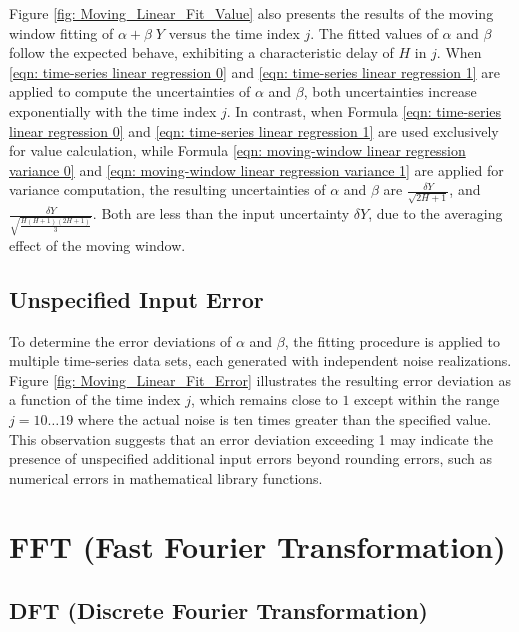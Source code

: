 \documentclass[twoside]{article}
\numberwithin{equation}{section}
\newcommand{\Verbose}{}
\begin{document}
Figure \ref{fig: Moving_Linear_Fit_Value} also presents the results of the moving window fitting of $\alpha + \beta\; Y$ versus the time index $j$.
The fitted values of $\alpha$ and $\beta$ follow the expected behave, exhibiting a characteristic delay of $H$ in $j$.
When \eqref{eqn: time-series linear regression 0} and \eqref{eqn: time-series linear regression 1} are applied to compute the uncertainties of $\alpha$ and $\beta$, both uncertainties increase exponentially with the time index $j$.
In contrast, when Formula \eqref{eqn: time-series linear regression 0} and \eqref{eqn: time-series linear regression 1} are used exclusively for value calculation, while Formula \eqref{eqn: moving-window linear regression variance 0} and \eqref{eqn: moving-window linear regression variance 1} are applied for variance computation, the resulting uncertainties of $\alpha$ and $\beta$ are $\frac{\delta Y}{\sqrt{2H+1}}$, and $\frac{\delta Y}{\sqrt{\frac{H (H+1)(2H+1)}{3}}}$.
Both are less than the input uncertainty $\delta Y$, due to the averaging effect of the moving window.


\subsection{Unspecified Input Error}

To determine the error deviations of $\alpha$ and $\beta$, the fitting procedure is applied to multiple time-series data sets, each generated with independent noise realizations.
Figure \ref{fig: Moving_Linear_Fit_Error} illustrates the resulting error deviation as a function of the time index $j$, which remains close to $1$ except within the range $j = 10 \dots 19$ where the actual noise is ten times greater than the specified value.
This observation suggests that an error deviation exceeding 1 may indicate the presence of unspecified additional input errors beyond rounding errors, such as numerical errors in mathematical library functions.







\ifdefined\Verbose
\clearpage
\fi
\section{FFT (Fast Fourier Transformation)}
\label{sec: FFT}

\subsection{DFT (Discrete Fourier Transformation)}
\end{document}
